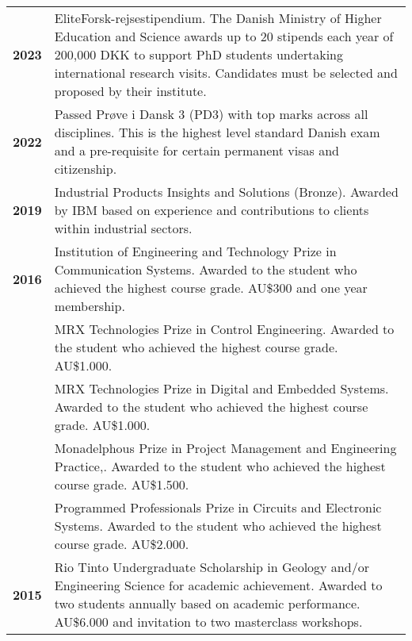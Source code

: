 \documentclass[a4paper,11pt]{article}
\begin{document}
\noindent
\begin{tabular}{lp{}}
    \textbf{2023} & EliteForsk-rejsestipendium. \textcolor{subduedcolour}{The Danish Ministry of Higher Education and Science awards up to 20 stipends each year of 200,000 DKK to support PhD students undertaking international research visits. Candidates must be selected and proposed by their institute.} \\

    \textbf{2022} & Passed Prøve i Dansk 3 (PD3) with top marks across all disciplines. \textcolor{subduedcolour}{This is the highest level standard Danish exam and a pre-requisite for certain permanent visas and citizenship.}\\

    \textbf{2019} & Industrial Products Insights and Solutions (Bronze). \textcolor{subduedcolour}{Awarded by IBM based on experience and contributions to clients within industrial sectors.} \\

    \textbf{2016} & Institution of Engineering and Technology Prize in Communication Systems. \textcolor{subduedcolour}{Awarded to the student who achieved the highest course grade. AU\$300 and one year membership.} \\

    & MRX Technologies Prize in Control Engineering. \textcolor{subduedcolour}{Awarded to the student who achieved the highest course grade. AU\$1.000.} \\

    & MRX Technologies Prize in Digital and Embedded Systems. \textcolor{subduedcolour}{Awarded to the student who achieved the highest course grade. AU\$1.000.} \\

    & Monadelphous Prize in Project Management and Engineering Practice,. \textcolor{subduedcolour}{Awarded to the student who achieved the highest course grade. AU\$1.500.} \\

    & Programmed Professionals Prize in Circuits and Electronic Systems. \textcolor{subduedcolour}{Awarded to the student who achieved the highest course grade. AU\$2.000.} \\

    \textbf{2015} & Rio Tinto Undergraduate Scholarship in Geology and/or Engineering Science for academic achievement. \textcolor{subduedcolour}{Awarded to two students annually based on academic performance. AU\$6.000 and invitation to two masterclass workshops.} \\


\end{tabular}
\end{document}
